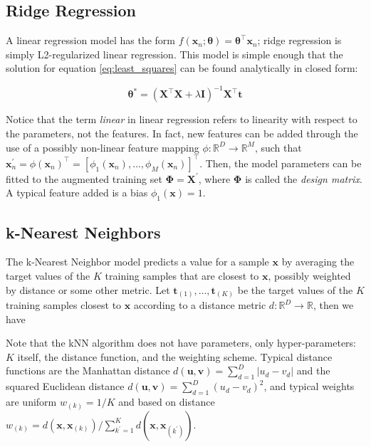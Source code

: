 \documentclass[a4paper,11pt]{kth-mag}
\begin{document}
\subsection{Ridge Regression}
\label{sec:ridge}
A linear regression model has the form $f(\bm x_n;\bm\theta)=\bm\theta^\intercal\bm x_n$; ridge regression is simply L2-regularized linear regression. This model is simple enough that the solution for equation \ref{eq:least_squares} can be found analytically in closed form:

\begin{equation}
\label{eq:ridge_solution}
\bm\theta^*=(\bm X^\intercal\bm X+\lambda\bm I)^{-1}\bm X^\intercal\bm t
\end{equation}

Notice that the term \emph{linear} in linear regression refers to linearity with respect to the parameters, not the features. In fact, new features can be added through the use of a possibly non-linear feature mapping $\phi:\mathbb{R}^D\rightarrow\mathbb{R}^M$, such that $\bm x^\prime_n=\phi(\bm x_n)^\intercal=\left[\phi_1(\bm x_n),\ldots,\phi_M(\bm x_n)\right]^\intercal$. Then, the model parameters can be fitted to the augmented training set $\bm\Phi=\bm X^\prime$, where $\bm\Phi$ is called the \emph{design matrix}. A typical feature added is a bias $\phi_1(\bm x)=1$.

\subsection{k-Nearest Neighbors}
The k-Nearest Neighbor model \citep{knn} predicts a value for a sample $\bm x$ by averaging the target values of the $K$ training samples that are closest to $\bm x$, possibly weighted by distance or some other metric. Let $\bm t_{(1)},\ldots,\bm t_{(K)}$ be the target values of the $K$ training samples closest to $\bm x$ according to a distance metric $d:\mathbb{R}^D\rightarrow\mathbb{R}$, then we have



Note that the kNN algorithm does not have parameters, only hyper-parameters: $K$ itself, the distance function, and the weighting scheme. Typical distance functions are the Manhattan distance $d(\bm u,\bm v)=\sum_{d=1}^D\vert u_d-v_d\vert$ and the squared Euclidean distance $d(\bm u,\bm v)=\sum_{d=1}^D(u_d-v_d)^2$, and typical weights are uniform $w_{(k)}=1/K$ and based on distance $w_{(k)}=d(\bm x,\bm x_{(k)})/\sum_{k^\prime=1}^K d(\bm x,\bm x_{(k^\prime)})$.
\end{document}
